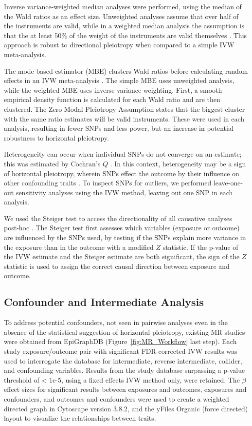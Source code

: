 \documentclass[journal,article,submit,moreauthors,pdftex]{Definitions/mdpi}
\begin{document}
Inverse variance-weighted median analyses were performed, using the median of the Wald ratios as an effect size. Unweighted analyses assume that over half of the instruments are valid, while in a weighted median analysis the assumption is that the at least 50\% of the weight of the instruments are valid themselves \cite{bowden_consistent_2016}. This approach is robust to directional pleiotropy when compared to a simple IVW meta-analysis.

The mode-based estimator (MBE) clusters Wald ratios before calculating random effects in an IVW meta-analysis \cite{hartwig_robust_2017}. The simple MBE uses unweighted analysis, while the weighted MBE uses inverse variance weighting. First, a smooth empirical density function is calculated for each Wald ratio and are then clustered. The Zero Modal Pleiotropy Assumption states that the biggest cluster with the same ratio estimates will be valid instruments. These were used in each analysis, resulting in fewer SNPs and less power, but an increase in potential robustness to horizontal pleiotropy.

Heterogeneity can occur when individual SNPs do not converge on an estimate; this was estimated by Cochran's $Q$ \cite{higgins_cochrane_2011}. In this context, heterogeneity may be a sign of horizontal pleiotropy, wherein SNPs effect the outcome by their influence on other confounding traits \cite{burgess_review_2017}. To inspect SNPs for outliers, we performed leave-one-out sensitivity analyses using the IVW method, leaving out one SNP in each analysis. 

We used the Steiger test to access the directionality of all causative analyses post-hoc \cite{hemani_orienting_2017}. The Steiger test first assesses which variables (exposure or outcome) are influenced by the SNPs used, by testing if the SNPs explain more variance in the exposure than in the outcome with a modified $Z$ statistic. If the p-value of the IVW estimate and the Steiger estimate are both significant, the sign of the $Z$ statistic is used to assign the correct causal direction between exposure and outcome.

\subsection{Confounder and Intermediate Analysis}
To address potential confounders, not seen in pairwise analyses even in the absence of the statistical suggestion of horizontal pleiotropy, existing MR studies were obtained from EpiGraphDB (Figure~\ref{fig:MR_Workflow} last step). Each study exposure/outcome pair with significant FDR-corrected IVW results was used to interrogate the database for intermediate, reverse intermediate, collider, and confounding variables. Results from the study database surpassing a p-value threshold of < 1e-5, using a fixed effects IVW method only, were retained. The $\beta$ effect sizes for significant results between exposures and outcomes, exposures and confounders, and outcomes and confounders were used to create a weighted directed graph in Cytoscape \cite{shannon_cytoscape_2003} version 3.8.2, and the yFiles Organic (force directed) layout to visualize the relationships between traits. 
\end{document}
